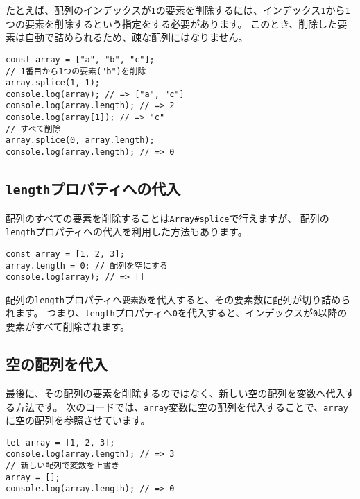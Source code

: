たとえば、配列のインデックスが\texttt{1}の要素を削除するには、インデックス\texttt{1}から\texttt{1}つの要素を削除するという指定をする必要があります。
このとき、削除した要素は自動で詰められるため、疎な配列にはなりません。

\begin{lstlisting}
const array = ["a", "b", "c"];
// 1番目から1つの要素("b")を削除
array.splice(1, 1);
console.log(array); // => ["a", "c"]
console.log(array.length); // => 2
console.log(array[1]); // => "c"
// すべて削除
array.splice(0, array.length);
console.log(array.length); // => 0
\end{lstlisting}

\hypertarget{assign-to-length}{%
\subsection{\texorpdfstring{\texttt{length}プロパティへの代入}{lengthプロパティへの代入}}\label{assign-to-length}}

配列のすべての要素を削除することは\texttt{Array\#splice}で行えますが、
配列の\texttt{length}プロパティへの代入を利用した方法もあります。

\begin{lstlisting}
const array = [1, 2, 3];
array.length = 0; // 配列を空にする
console.log(array); // => []
\end{lstlisting}

配列の\texttt{length}プロパティへ\texttt{要素数}を代入すると、その要素数に配列が切り詰められます。
つまり、\texttt{length}プロパティへ\texttt{0}を代入すると、インデックスが\texttt{0}以降の要素がすべて削除されます。

\hypertarget{assign-empty-array}{%
\subsection{空の配列を代入}\label{assign-empty-array}}

最後に、その配列の要素を削除するのではなく、新しい空の配列を変数へ代入する方法です。
次のコードでは、\texttt{array}変数に空の配列を代入することで、\texttt{array}に空の配列を参照させています。

\begin{lstlisting}
let array = [1, 2, 3];
console.log(array.length); // => 3
// 新しい配列で変数を上書き
array = [];
console.log(array.length); // => 0
\end{lstlisting}

